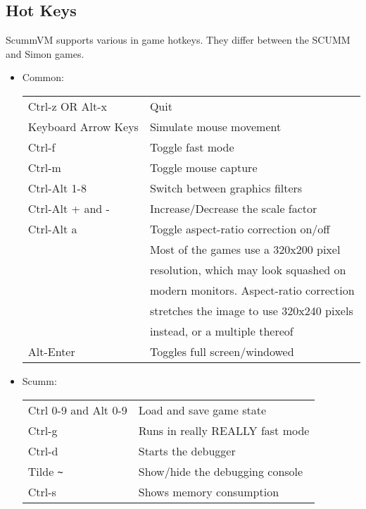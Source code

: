 

\subsection{Hot Keys}
ScummVM supports various in game hotkeys. They differ between the SCUMM and
Simon games.
\begin{itemize}
\item Common:\\
  \begin{tabular}{ll}
    Ctrl-z OR Alt-x        & Quit\\
    Keyboard Arrow Keys    & Simulate mouse movement\\
    Ctrl-f                 & Toggle fast mode\\
    Ctrl-m                 & Toggle mouse capture\\
    Ctrl-Alt 1-8           & Switch between graphics filters\\
    Ctrl-Alt + and -       & Increase/Decrease the scale factor\\
    Ctrl-Alt a             & Toggle aspect-ratio correction on/off\\
                           & Most of the games use a 320x200 pixel\\
                           & resolution, which may look squashed on\\
                           & modern monitors. Aspect-ratio correction\\
                           & stretches the image to use 320x240 pixels\\
                           & instead, or a multiple thereof\\
    Alt-Enter              & Toggles full screen/windowed\\
  \end{tabular}
\item Scumm:\\
  \begin{tabular}{ll}
    Ctrl 0-9 and Alt 0-9   & Load and save game state\\
    Ctrl-g                 & Runs in really REALLY fast mode\\
    Ctrl-d                 & Starts the debugger\\
    Tilde \verb#~#         & Show/hide the debugging console\\
    Ctrl-s                 & Shows memory consumption\\

\end{tabular}
\end{itemize}
